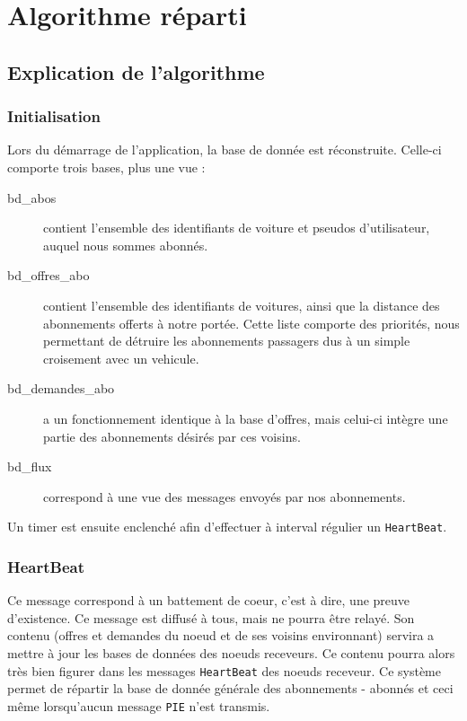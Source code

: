 
\section{Algorithme réparti}



\subsection{Explication de l'algorithme}
\subsubsection{Initialisation}
Lors du démarrage de l'application, la base de donnée est réconstruite. Celle-ci comporte trois bases, plus une vue :
\begin{description}
	\item[bd\_abos] contient l'ensemble des identifiants de voiture et pseudos d'utilisateur, auquel nous sommes abonnés.
	\item[bd\_offres\_abo] contient l'ensemble des identifiants de voitures, ainsi que la distance des abonnements offerts à notre portée. Cette liste comporte des priorités, nous permettant de détruire les abonnements passagers dus à un simple croisement avec un vehicule.
	\item[bd\_demandes\_abo] a un fonctionnement identique à la base d'offres, mais celui-ci intègre une partie des abonnements désirés par ces voisins.
	\item[bd\_flux] correspond à une vue des messages envoyés par nos abonnements.
\end{description}

Un timer est ensuite enclenché afin d'effectuer à interval régulier un \texttt{HeartBeat}.

\subsubsection{HeartBeat}
Ce message correspond à un battement de coeur, c'est à dire, une preuve d'existence. Ce message est diffusé à tous, mais ne pourra être relayé. Son contenu (offres et demandes du noeud et de ses voisins environnant) servira a mettre à jour les bases de données des noeuds receveurs. Ce contenu pourra alors très bien figurer dans les messages \texttt{HeartBeat} des noeuds receveur. Ce système permet de répartir la base de donnée générale des abonnements - abonnés et ceci même lorsqu'aucun message \texttt{PIE} n'est transmis.

